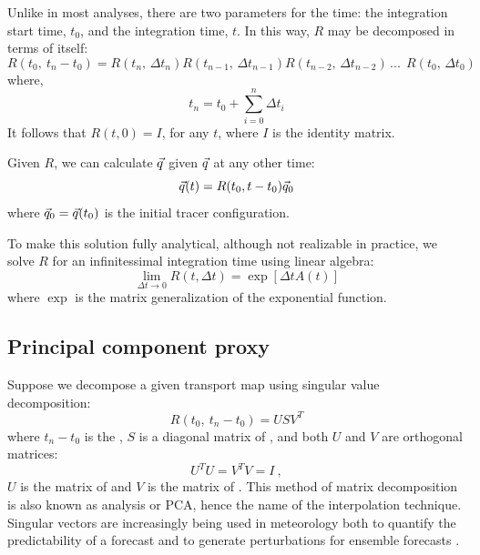 Unlike in most analyses, there are two parameters for the time:
the integration start time, $t_0$, and the integration time, $t$.
In this way, $R$ may be decomposed in terms of itself:
\begin{equation}
	R(t_0,~t_n-t_0) = R(t_n, \, \Delta t_n) R(t_{n-1},\,\Delta t_{n-1}) R(t_{n-2},\,\Delta t_{n-2}) \, ...~~ 
	R(t_0,\,\Delta t_0)
\label{matrix_soln_decomposition}
\end{equation}
where,
\begin{equation}
t_n=t_0+\sum_{i=0}^{n} \Delta t_i
\end{equation}
It follows that $R(t, 0)=I$, for any $t$, where $I$ is the identity matrix.

Given $R$, 
we can calculate $\vec q$ given $\vec q$ at any other time:
\begin{equation}
	\vec q(t) = R(t_0, t-t_0) \vec q_0
	\label{tracer_integration}
\end{equation}
where $\vec q_0 = \vec q(t_0)$ is the initial tracer configuration.

To make this solution fully analytical, although not realizable in practice,
we solve $R$ for an infinitessimal integration time using linear algebra:
\begin{equation}
	\lim_{\Delta t \rightarrow 0} R(t, \Delta t) = \exp \left [ \Delta t A(t) \right ]
\end{equation}
where $\exp$ is the matrix generalization of the exponential function.

\subsection{Principal component proxy}

Suppose we decompose a given transport map using singular value decomposition:
\begin{equation}
	R(t_0, ~ t_n - t_0) = U S V^T
	\label{SVD}
\end{equation}
where 
$t_n - t_0$ is the ,
$S$ is a diagonal matrix of ,
and both $U$ and $V$ are orthogonal matrices:
\begin{equation}
	U^T U = V^T V = I~,
\end{equation}
$U$ is the matrix of  and 
$V$ is the matrix of  \citep{Press_etal1992}.
This method of matrix decomposition is also known as 
analysis or PCA, hence the name of the interpolation technique.
Singular vectors are increasingly being used in meteorology both to quantify the
predictability of a forecast and to generate perturbations for ensemble
forecasts \citep{Tang_etal2006}.

